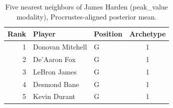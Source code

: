 \begin{table}[htbp]
  \centering\small
  \begin{tabular}{rllc}
    \toprule
    Rank & Player & Position & Archetype \\
    \midrule
    1 & Donovan Mitchell & G & 1 \\
    2 & De'Aaron Fox & G & 1 \\
    3 & LeBron James & G & 1 \\
    4 & Desmond Bane & G & 1 \\
    5 & Kevin Durant & G & 1 \\
    \bottomrule
  \end{tabular}
  \caption{Five nearest neighbors of James Harden (peak_value modality), Procrustes-aligned posterior mean.}
  \label{tab:James_Harden_neighbors_peak_value}
\end{table}

